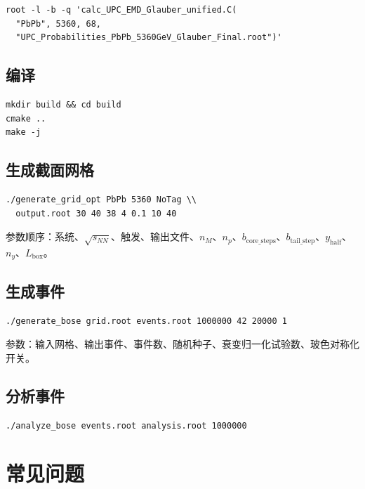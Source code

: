 \documentclass[11pt,a4paper,UTF8]{ctexart}
\begin{document}
\begin{verbatim}
root -l -b -q 'calc_UPC_EMD_Glauber_unified.C(
  "PbPb", 5360, 68, 
  "UPC_Probabilities_PbPb_5360GeV_Glauber_Final.root")'
\end{verbatim}

\subsection{编译}

\begin{verbatim}
mkdir build && cd build
cmake ..
make -j
\end{verbatim}

\subsection{生成截面网格}

\begin{verbatim}
./generate_grid_opt PbPb 5360 NoTag \\
  output.root 30 40 38 4 0.1 10 40
\end{verbatim}

参数顺序：系统、$\sqrt{s_{NN}}$、触发、输出文件、$n_M$、$n_p$、$b_{\text{core\_steps}}$、$b_{\text{tail\_step}}$、$y_{\text{half}}$、$n_y$、$L_{\text{box}}$。

\subsection{生成事件}

\begin{verbatim}
./generate_bose grid.root events.root 1000000 42 20000 1
\end{verbatim}

参数：输入网格、输出事件、事件数、随机种子、衰变归一化试验数、玻色对称化开关。

\subsection{分析事件}

\begin{verbatim}
./analyze_bose events.root analysis.root 1000000
\end{verbatim}

\section{常见问题}
\end{document}
